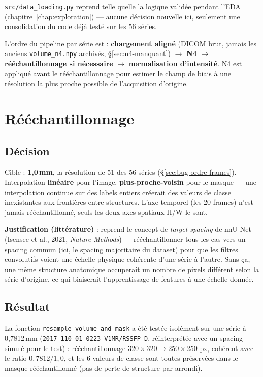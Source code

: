 \texttt{src/data\_loading.py} reprend telle quelle la logique validée pendant l'EDA
(chapitre~\ref{chap:exploration}) --- aucune décision nouvelle ici, seulement une
consolidation du code déjà testé sur les 56 séries.

L'ordre du pipeline par série est : \textbf{chargement aligné} (DICOM brut, jamais les
anciens \texttt{volume\_n4.npy} archivés, \S\ref{sec:n4-manquant}) $\to$ \textbf{N4}
$\to$ \textbf{rééchantillonnage si nécessaire} $\to$ \textbf{normalisation
d'intensité}. N4 est appliqué avant le rééchantillonnage pour estimer le champ de biais
à une résolution la plus proche possible de l'acquisition d'origine.

\section{Rééchantillonnage}

\subsection{Décision}

Cible : \textbf{1,0\,mm}, la résolution de 51 des 56 séries (\S\ref{sec:bug-ordre-frames}).
Interpolation \textbf{linéaire} pour l'image, \textbf{plus-proche-voisin} pour le masque
--- une interpolation continue sur des labels entiers créerait des valeurs de classe
inexistantes aux frontières entre structures. L'axe temporel (les 20 frames) n'est
jamais rééchantillonné, seuls les deux axes spatiaux H/W le sont.

\textbf{Justification (littérature)} : reprend le concept de \emph{target spacing} de
nnU-Net (Isensee et al., 2021, \emph{Nature Methods}) --- rééchantillonner tous les cas
vers un spacing commun (ici, le spacing majoritaire du dataset) pour que les filtres
convolutifs voient une échelle physique cohérente d'une série à l'autre. Sans ça, une
même structure anatomique occuperait un nombre de pixels différent selon la série
d'origine, ce qui biaiserait l'apprentissage de features à une échelle donnée.

\subsection{Résultat}

La fonction \texttt{resample\_volume\_and\_mask} a été testée isolément sur une série à
0,7812\,mm (\texttt{2017-110\_01-0223-V1MR/RSSFP D}, réinterprétée avec un spacing
simulé pour le test) : rééchantillonnage $320\times320 \to 250\times250$ px, cohérent
avec le ratio $0,7812/1,0$, et les 6 valeurs de classe sont toutes préservées dans le
masque rééchantillonné (pas de perte de structure par arrondi).

